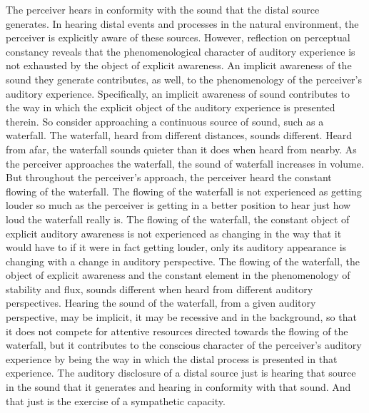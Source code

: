 The perceiver hears in conformity with the sound that the distal source generates. In hearing distal events and processes in the natural environment, the perceiver is explicitly aware of these sources. However, reflection on perceptual constancy reveals that the phenomenological character of auditory experience is not exhausted by the object of explicit awareness. An implicit awareness of the sound they generate contributes, as well, to the phenomenology of the perceiver's auditory experience. Specifically, an implicit awareness of sound contributes to the way in which the explicit object of the auditory experience is presented therein. So consider approaching a continuous source of sound, such as a waterfall. The waterfall, heard from different distances, sounds different. Heard from afar, the waterfall sounds quieter than it does when heard from nearby. As the perceiver approaches the waterfall, the sound of waterfall increases in volume. But throughout the perceiver's approach, the perceiver heard the constant flowing of the waterfall. The flowing of the waterfall is not experienced as getting louder so much as the perceiver is getting in a better position to hear just how loud the waterfall really is. The flowing of the waterfall, the constant object of explicit auditory awareness is not experienced as changing in the way that it would have to if it were in fact getting louder, only its auditory appearance is changing with a change in auditory perspective. The flowing of the waterfall, the object of explicit awareness and the constant element in the phenomenology of stability and flux, sounds different when heard from different auditory perspectives. Hearing the sound of the waterfall, from a given auditory perspective, may be implicit, it may be recessive and in the background, so that it does not compete for attentive resources directed towards the flowing of the waterfall, but it contributes to the conscious character of the perceiver's auditory experience by being the way in which the distal process is presented in that experience. The auditory disclosure of a distal source just is hearing that source in the sound that it generates and hearing in conformity with that sound. And that just is the exercise of a sympathetic capacity.

